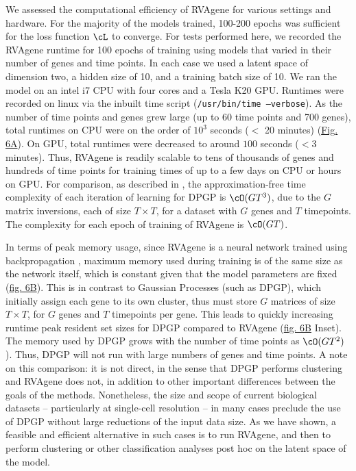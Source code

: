 We assessed the computational efficiency of RVAgene for various settings and hardware. For the majority of the models trained, 100-200 epochs was sufficient for the loss function $\cL$ to converge. For tests performed here, we recorded the RVAgene runtime for 100 epochs of training using models that varied in their number of genes and time points. In each case we used a latent space of dimension two, a hidden size of 10, and a training batch size of 10. We ran the model on an intel i7 CPU with four cores and a Tesla K20 GPU. Runtimes were recorded on linux via the inbuilt time script (\texttt{/usr/bin/time --verbose}). As the number of time points and genes grew large (up to 60 time points and 700 genes), total runtimes on CPU were on the order of $10^3$ seconds ($<$ 20 minutes) (\hyperref[fig:fig7]{Fig. 6A}). On GPU, total runtimes were decreased to around $100$ seconds ($< 3$ minutes). Thus, RVAgene is readily scalable to tens of thousands of genes and hundreds of time points for training times of up to a few days on CPU or hours on GPU. For comparison, as described in \citet{McDowell2018}, the approximation-free time complexity of each iteration of learning for DPGP is $\cO(GT^3)$, due to the $G$ matrix inversions, each of size $T \times T$, for a dataset with $G$ genes and $T$ timepoints. The complexity for each epoch of training of RVAgene is $\cO(GT)$.
\par 
In terms of peak memory usage, since RVAgene is a neural network trained using backpropagation  \citep{rumelhart1986learning}, maximum memory used during training is of the same size as the network itself, which is constant given that the model parameters are fixed  (\hyperref[fig:fig7]{fig. 6B}). This is in contrast to Gaussian Processes (such as DPGP), which initially assign each gene to its own cluster, thus must store $G$ matrices of size $T\times T $, for $G$ genes and $T$ timepoints per gene. This leads to quickly increasing runtime peak resident set sizes for DPGP compared to RVAgene (\hyperref[fig:fig7]{fig. 6B} Inset). The memory used by DPGP grows with the number of time points as $\cO(GT^2)$). Thus, DPGP will not run with large numbers of genes and time points. %
A note on this comparison: it is not direct, in the sense that DPGP performs clustering and RVAgene does not, in addition to other important differences between the goals of the methods. 
Nonetheless, the size and scope of current biological datasets -- particularly at single-cell resolution -- in many cases preclude the use of DPGP without large reductions of the input data size. As we have shown, a feasible and efficient alternative in such cases is to run RVAgene, and then to perform clustering or other classification analyses post hoc on the latent space of the model. 

